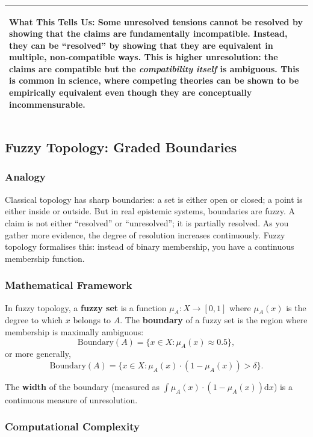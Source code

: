 \documentclass[11pt,letterpaper]{article}
\theoremstyle{definition}
\theoremstyle{remark}
\newenvironment{insightbox}{%
  \vspace{0.3cm}%
  \noindent\begin{tabular}{|p{\dimexpr\textwidth-4\tabcolsep-2\arrayrulewidth}|}
  \hline
  \small\itshape\color{accent}
}{%
  \\ \hline
  \end{tabular}
  \vspace{0.3cm}
}
\begin{document}
\begin{insightbox}
\textbf{What This Tells Us:} Some unresolved tensions cannot be resolved by showing that the claims are fundamentally incompatible. Instead, they can be ``resolved'' by showing that they are equivalent in multiple, non-compatible ways. This is higher unresolution: the claims are compatible but the \emph{compatibility itself} is ambiguous. This is common in science, where competing theories can be shown to be empirically equivalent even though they are conceptually incommensurable.
\end{insightbox}

\subsection{Fuzzy Topology: Graded Boundaries}

\subsubsection*{Analogy}

Classical topology has sharp boundaries: a set is either open or closed; a point is either inside or outside. But in real epistemic systems, boundaries are fuzzy. A claim is not either ``resolved'' or ``unresolved''; it is partially resolved. As you gather more evidence, the degree of resolution increases continuously. Fuzzy topology formalises this: instead of binary membership, you have a continuous membership function.

\subsubsection*{Mathematical Framework}

In fuzzy topology, a \textbf{fuzzy set} is a function $\mu_A : X \to [0,1]$ where $\mu_A(x)$ is the degree to which $x$ belongs to $A$. The \textbf{boundary} of a fuzzy set is the region where membership is maximally ambiguous:
\[
\mathrm{Boundary}(A) = \{x \in X : \mu_A(x) \approx 0.5\},
\]
or more generally,
\[
\mathrm{Boundary}(A) = \{x \in X : \mu_A(x) \cdot (1 - \mu_A(x)) > \delta\}.
\]

The \textbf{width} of the boundary (measured as $\int \mu_A(x) \cdot (1 - \mu_A(x)) \mathrm{d}x$) is a continuous measure of unresolution.

\subsubsection*{Computational Complexity}
\end{document}
